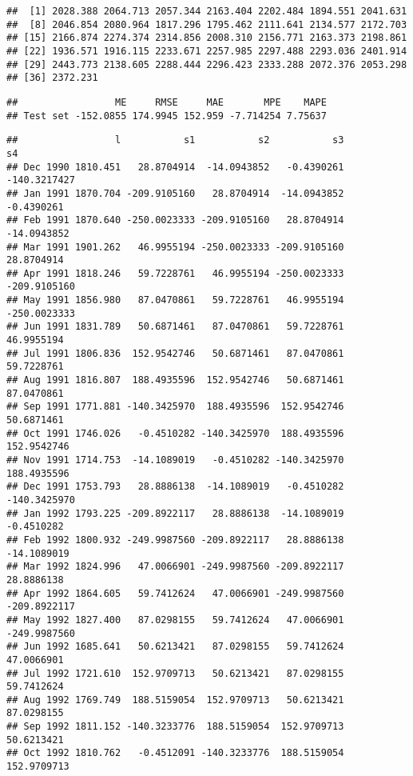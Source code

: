 \documentclass[]{article}
\begin{document}
\begin{verbatim}
##  [1] 2028.388 2064.713 2057.344 2163.404 2202.484 1894.551 2041.631
##  [8] 2046.854 2080.964 1817.296 1795.462 2111.641 2134.577 2172.703
## [15] 2166.874 2274.374 2314.856 2008.310 2156.771 2163.373 2198.861
## [22] 1936.571 1916.115 2233.671 2257.985 2297.488 2293.036 2401.914
## [29] 2443.773 2138.605 2288.444 2296.423 2333.288 2072.376 2053.298
## [36] 2372.231
\end{verbatim}

\begin{verbatim}
##                 ME     RMSE     MAE       MPE    MAPE
## Test set -152.0855 174.9945 152.959 -7.714254 7.75637
\end{verbatim}

\begin{verbatim}
##                 l           s1           s2           s3           s4
## Dec 1990 1810.451   28.8704914  -14.0943852   -0.4390261 -140.3217427
## Jan 1991 1870.704 -209.9105160   28.8704914  -14.0943852   -0.4390261
## Feb 1991 1870.640 -250.0023333 -209.9105160   28.8704914  -14.0943852
## Mar 1991 1901.262   46.9955194 -250.0023333 -209.9105160   28.8704914
## Apr 1991 1818.246   59.7228761   46.9955194 -250.0023333 -209.9105160
## May 1991 1856.980   87.0470861   59.7228761   46.9955194 -250.0023333
## Jun 1991 1831.789   50.6871461   87.0470861   59.7228761   46.9955194
## Jul 1991 1806.836  152.9542746   50.6871461   87.0470861   59.7228761
## Aug 1991 1816.807  188.4935596  152.9542746   50.6871461   87.0470861
## Sep 1991 1771.881 -140.3425970  188.4935596  152.9542746   50.6871461
## Oct 1991 1746.026   -0.4510282 -140.3425970  188.4935596  152.9542746
## Nov 1991 1714.753  -14.1089019   -0.4510282 -140.3425970  188.4935596
## Dec 1991 1753.793   28.8886138  -14.1089019   -0.4510282 -140.3425970
## Jan 1992 1793.225 -209.8922117   28.8886138  -14.1089019   -0.4510282
## Feb 1992 1800.932 -249.9987560 -209.8922117   28.8886138  -14.1089019
## Mar 1992 1824.996   47.0066901 -249.9987560 -209.8922117   28.8886138
## Apr 1992 1864.605   59.7412624   47.0066901 -249.9987560 -209.8922117
## May 1992 1827.400   87.0298155   59.7412624   47.0066901 -249.9987560
## Jun 1992 1685.641   50.6213421   87.0298155   59.7412624   47.0066901
## Jul 1992 1721.610  152.9709713   50.6213421   87.0298155   59.7412624
## Aug 1992 1769.749  188.5159054  152.9709713   50.6213421   87.0298155
## Sep 1992 1811.152 -140.3233776  188.5159054  152.9709713   50.6213421
## Oct 1992 1810.762   -0.4512091 -140.3233776  188.5159054  152.9709713

\end{verbatim}
\end{document}
